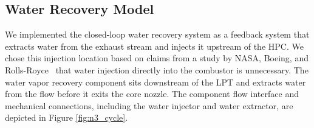 \documentclass[conf]{new-aiaa}
\begin{document}
\subsection{Water Recovery Model}
We implemented the closed-loop water recovery system as a feedback system that extracts water from the exhaust stream and injects it upstream of the HPC.
We chose this injection location based on claims from a study by NASA, Boeing, and Rolls-Royce~\cite{Daggett2010} that water injection directly into the combustor is unnecessary.
The water vapor recovery component sits downstream of the LPT and extracts water from the flow before it exits the core nozzle.
The component flow interface and mechanical connections, including the water injector and water extractor, are depicted in Figure \ref{fig:n3_cycle}.
\end{document}
